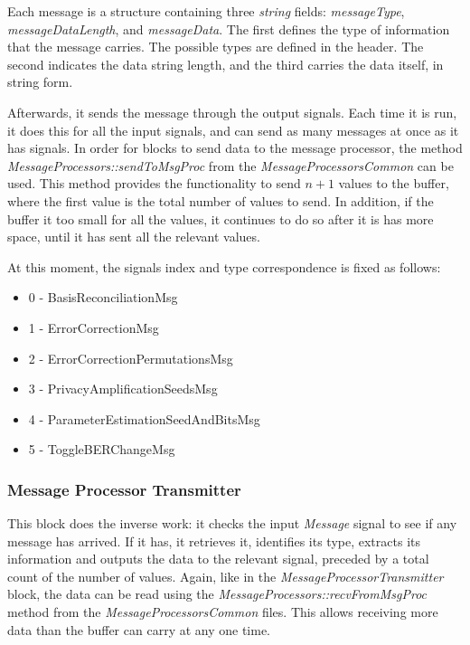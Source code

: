 Each message is a structure containing three \textit{string} fields:
\textit{messageType}, \textit{messageDataLength}, and \textit{messageData}. The
first defines the type of information that the message carries. The possible
types are defined in the  header. The second
indicates the data string length, and the third carries the data itself, in
string form. 

Afterwards, it sends the message through the output signals.
Each time it is run, it does this for all the input signals, and can send as
many messages at once as it has signals.
In order for blocks to send data to the message processor, the method
\textit{MessageProcessors::sendToMsgProc} from the
\textit{MessageProcessorsCommon} can be used. This method provides the
functionality to send $n+1$ values to the buffer, where the first value is the
total number of values to send. In addition, if the buffer it too small for all
the values, it continues to do so after it is has more space, until it has sent
all the relevant values.

At this moment, the signals index and type correspondence is fixed as follows:

\begin{itemize}
    \item 0 - BasisReconciliationMsg
    \item 1 - ErrorCorrectionMsg
    \item 2 - ErrorCorrectionPermutationsMsg
    \item 3 - PrivacyAmplificationSeedsMsg
    \item 4 - ParameterEstimationSeedAndBitsMsg
    \item 5 - ToggleBERChangeMsg
\end{itemize}

\subsubsection*{Message Processor Transmitter}
This block does the inverse work: it checks the input \textit{Message} signal to
see if any message has arrived. If it has, it retrieves it, identifies its type,
extracts its information and outputs the data to the relevant signal, preceded
by a total count of the number of values. Again, like in the
\textit{MessageProcessorTransmitter} block, the data can be read using the
\textit{MessageProcessors::recvFromMsgProc} method from the
\textit{MessageProcessorsCommon} files. This allows receiving more data than the
buffer can carry at any one time.


